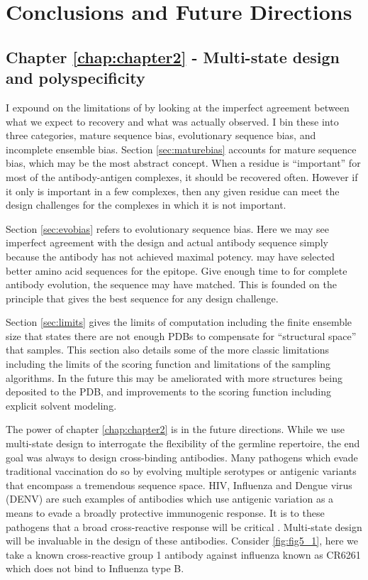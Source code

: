 \chapter{Conclusions and Future Directions}
\label{chap:chapter5}
\section{Chapter \ref{chap:chapter2} - Multi-state design and polyspecificity}
I expound on the limitations of \rosettadesign by looking at the imperfect agreement between what we expect \rosettadesign to recovery and what was actually observed. I bin these into three categories, mature sequence bias, evolutionary sequence bias, and incomplete ensemble bias. Section \ref{sec:maturebias} accounts for mature sequence bias, which may be the most abstract concept. When a residue is ``important'' for most of the antibody-antigen complexes, it should be recovered often. However if it only is important in a few complexes, then any given residue can meet the design challenges for the complexes in which it is not important.

Section \ref{sec:evobias} refers to evolutionary sequence bias. Here we may see imperfect agreement with the design and actual antibody sequence simply because the antibody has not achieved maximal potency. \rosettadesign may have selected better amino acid sequences for the epitope. Give enough time to for complete antibody evolution, the sequence may have matched. This is founded on the principle that \rosettadesign gives the best sequence for any design challenge.

Section \ref{sec:limits} gives the limits of computation including the finite ensemble size that states there are not enough PDBs to compensate for ``structural space'' that \rosettadesign samples. This section also details some of the more classic limitations including the limits of the \rosetta scoring function and limitations of the sampling algorithms. In the future this may be ameliorated with more structures being deposited to the PDB, and improvements to the scoring function including explicit solvent modeling.

The power of chapter \ref{chap:chapter2} is in the future directions. While we use multi-state design to interrogate the flexibility of the germline repertoire, the end goal was always to design cross-binding antibodies. Many pathogens which evade traditional vaccination do so by evolving multiple serotypes or antigenic variants that encompass a tremendous sequence space. HIV, Influenza and Dengue virus (DENV) are such examples of antibodies which use antigenic variation as a means to evade a broadly protective immunogenic response. It is to these pathogens that a broad cross-reactive response will be critical \citep{Corti:2013ex,Lanzavecchia:2009dd,Corti:2011ku,Simonelli:2013jc}. Multi-state design will be invaluable in the design of these antibodies. Consider \ref{fig:fig5_1}, here we take a known cross-reactive group 1 antibody against influenza known as CR6261 \citep{Throsby:2008dc} which does not bind to Influenza type B.

